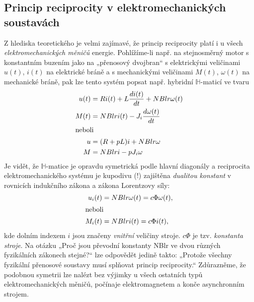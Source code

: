     \subsection{Princip reciprocity v elektromechanických 
    soustavách}\label{teo:IchapIIsecIsubIX}
      Z hlediska teoretického je velmi zajímavé, že princip reciprocity platí i u všech 
      \emph{elektromechanických měničů} energie. Pohlížíme-li např. na stejnosměrný motor s 
      konstantním buzením jako na „přenosový dvojbran“ s elektrickými veličinami \(u(t)\), \(i(t)\) 
      na elektrické bráně a s mechanickými veličinami \(M(t)\), \(\omega(t)\) na mechanické bráně, 
      pak lze tento systém popsat např. hybridní \(\mathbb{H}\)-maticí ve tvaru
      \begin{subequations}\label{ES:eq_topol16}
        \begin{align}
          u(t) &= Ri(t) + L\dfrac{d i(t)}{d t} + NBlr\omega(t)  \\
          M(t) &= NBlri(t) - J_i\dfrac{d \omega(t)}{d t}        \\
          \shortintertext{neboli}
             u &= (R+pL)i + NBlr\omega  \\
             M &= NBlri - pJ_i\omega
        \end{align}
      \end{subequations}
      Je vidět, že \(\mathbb{H}\)-matice je opravdu symetrická podle hlavní diagonály a reciprocita 
      elektromechanického systému je kupodivu (!) zajištěna \emph{dualitou konstant} v rovnicích 
      indukčního zákona a zákona Lorentzovy síly:
      \begin{subequations}\label{ES:eq_topol17}
        \begin{align}
          u_i(t) &= NBlr\omega(t) = c\Phi\omega(t), \\
          \shortintertext{neboli}
          M_i(t) &= NBlr i(t) = c\Phi i(t),
        \end{align}
      \end{subequations}
      kde dolním indexem \(i\) jsou značeny \emph{vnitřní} veličiny stroje. \(c\Phi\) je tzv. 
      \emph{konstanta stroje}. Na otázku „Proč jsou převodní konstanty NBlr ve dvou různých 
      fyzikálních zákonech stejné?“ lze odpovědět jedině takto: „Protože všechny fyzikální 
      přenosové soustavy musí splňovat princip reciprocity.“ Zdůrazněme, že podobnou symetrii lze 
      nalézt bez výjimky u všech ostatních typů elektromechanických měničů, počínaje 
      elektromagnetem a konče asynchronním strojem.
  
